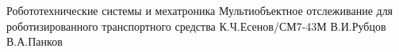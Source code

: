                 {Робототехнические системы и мехатроника}
                {Мультиобъектное отслеживание для роботизированного транспортного средства}
                {К.Ч.Есенов/СМ7-43М}
                {В.И.Рубцов}
				{}
                {В.А.Панков}
